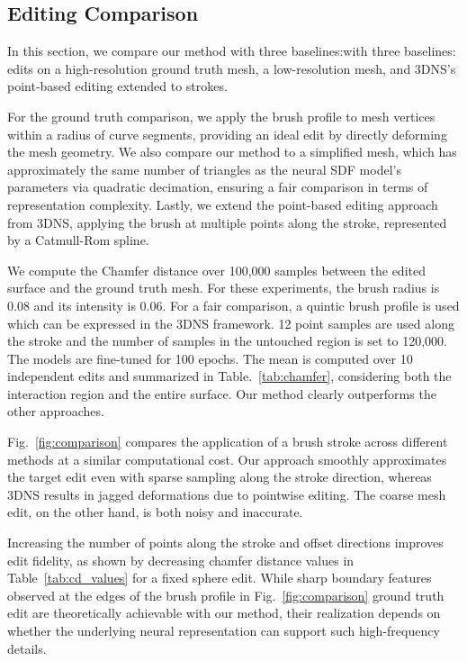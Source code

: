 \subsection{Editing Comparison}

In this section, we compare our method with three baselines:with three baselines: edits on a high-resolution ground truth mesh, a low-resolution mesh, and 3DNS's point-based editing extended to strokes.

For the ground truth comparison, we apply the brush profile to mesh vertices within a radius of curve segments, providing an ideal edit by directly deforming the mesh geometry. We also compare our method to a simplified mesh, which has approximately the same number of triangles as the neural SDF model’s parameters via quadratic decimation, ensuring a fair comparison in terms of representation complexity. Lastly, we extend the point-based editing approach from 3DNS, applying the brush at multiple points along the stroke, represented by a Catmull-Rom spline.

We compute the Chamfer distance over 100,000 samples between the edited surface and the ground truth mesh. For these experiments, the brush radius is 0.08 and its intensity is 0.06. For a fair comparison, a quintic brush profile is used which can be expressed in the 3DNS framework. 12 point samples are used along the stroke and the number of samples in the untouched region is set to 120,000. The models are fine-tuned for 100 epochs. The mean is computed over 10 independent edits and summarized in Table.~\ref{tab:chamfer}, considering both the interaction region and the entire surface. Our method clearly outperforms the other approaches.

Fig.~\ref{fig:comparison} compares the application of a brush stroke across different methods at a similar computational cost. Our approach smoothly approximates the target edit even with sparse sampling along the stroke direction, whereas 3DNS results in jagged deformations due to pointwise editing. The coarse mesh edit, on the other hand, is both noisy and inaccurate.  

Increasing the number of points along the stroke and offset directions improves edit fidelity, as shown by decreasing chamfer distance values in Table~\ref{tab:cd_values} for a fixed sphere edit. While sharp boundary features observed at the edges of the brush profile in Fig.~\ref{fig:comparison} ground truth edit are theoretically achievable with our method, their realization depends on whether the underlying neural representation can support such high-frequency details.

